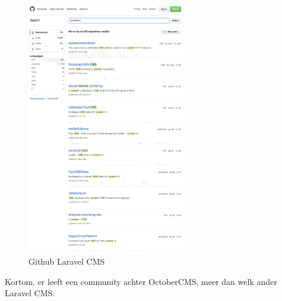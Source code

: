 \begin{figure}[!ht]
  \includegraphics[width=70mm]{img/github_laravelCMS.png}
  \centering
  \caption{Github Laravel CMS}
  \label{fig:Github Laravel CMS}
\end{figure}

\noindent
Kortom, er leeft een community achter OctoberCMS, meer dan welk ander Laravel CMS. 

